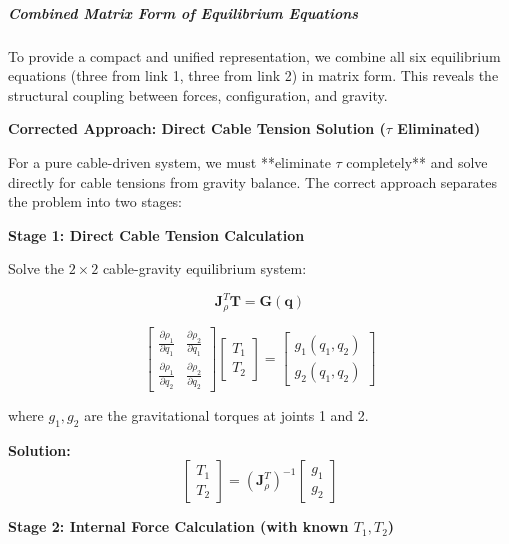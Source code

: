 \subparagraph{Combined Matrix Form of Equilibrium Equations}

To provide a compact and unified representation, we combine all six equilibrium equations (three from link 1, three from link 2) in matrix form. This reveals the structural coupling between forces, configuration, and gravity.

\textbf{Corrected Approach: Direct Cable Tension Solution ($\tau$ Eliminated)}

For a pure cable-driven system, we must **eliminate $\tau$ completely** and solve directly for cable tensions from gravity balance. The correct approach separates the problem into two stages:

\textbf{Stage 1: Direct Cable Tension Calculation}

Solve the $2 \times 2$ cable-gravity equilibrium system:

\begin{equation}
\mathbf{J}_{\rho}^T \mathbf{T} = \mathbf{G}(\mathbf{q})
\end{equation}

\begin{equation}
\begin{bmatrix}
\frac{\partial \rho_1}{\partial q_1} & \frac{\partial \rho_2}{\partial q_1} \\
\frac{\partial \rho_1}{\partial q_2} & \frac{\partial \rho_2}{\partial q_2}
\end{bmatrix}
\begin{bmatrix} T_1 \\ T_2 \end{bmatrix} = 
\begin{bmatrix} g_1(q_1, q_2) \\ g_2(q_1, q_2) \end{bmatrix}
\end{equation}

where $g_1, g_2$ are the gravitational torques at joints 1 and 2.

\textbf{Solution:}
\begin{equation}
\begin{bmatrix} T_1 \\ T_2 \end{bmatrix} = (\mathbf{J}_{\rho}^T)^{-1} \begin{bmatrix} g_1 \\ g_2 \end{bmatrix}
\end{equation}

\textbf{Stage 2: Internal Force Calculation (with known $T_1, T_2$)}


